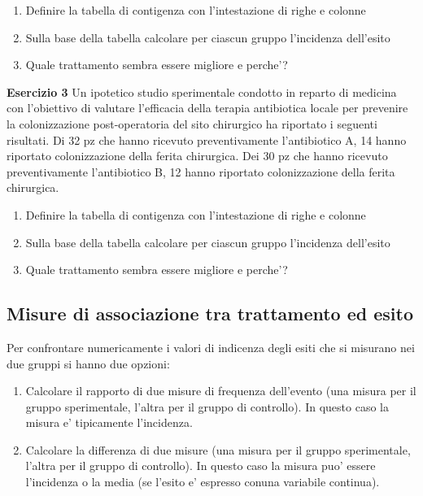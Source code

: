 \documentclass[]{book}
\begin{document}
\begin{enumerate}
\def\labelenumi{\arabic{enumi})}
\item
  Definire la tabella di contigenza con l'intestazione di righe e colonne
\item
  Sulla base della tabella calcolare per ciascun gruppo l'incidenza dell'esito
\item
  Quale trattamento sembra essere migliore e perche'?
\end{enumerate}

\textbf{Esercizio 3}
Un ipotetico studio sperimentale condotto in reparto di medicina con l'obiettivo di valutare l'efficacia della terapia antibiotica locale per prevenire la colonizzazione post-operatoria del sito chirurgico ha riportato i seguenti risultati. Di 32 pz che hanno ricevuto preventivamente l'antibiotico A, 14 hanno riportato colonizzazione della ferita chirurgica. Dei 30 pz che hanno ricevuto preventivamente l'antibiotico B, 12 hanno riportato colonizzazione della ferita chirurgica.

\begin{enumerate}
\def\labelenumi{\arabic{enumi})}
\item
  Definire la tabella di contigenza con l'intestazione di righe e colonne
\item
  Sulla base della tabella calcolare per ciascun gruppo l'incidenza dell'esito
\item
  Quale trattamento sembra essere migliore e perche'?
\end{enumerate}

\hypertarget{misure-di-associazione-tra-trattamento-ed-esito}{%
\subsection{Misure di associazione tra trattamento ed esito}\label{misure-di-associazione-tra-trattamento-ed-esito}}

Per confrontare numericamente i valori di indicenza degli esiti che si misurano nei due gruppi si hanno due opzioni:

\begin{enumerate}
\def\labelenumi{\arabic{enumi}.}
\item
  Calcolare il rapporto di due misure di frequenza dell'evento (una misura per il gruppo sperimentale, l'altra per il gruppo di controllo). In questo caso la misura e' tipicamente l'incidenza.
\item
  Calcolare la differenza di due misure (una misura per il gruppo sperimentale, l'altra per il gruppo di controllo). In questo caso la misura puo' essere l'incidenza o la media (se l'esito e' espresso conuna variabile continua).
\end{enumerate}
\end{document}
